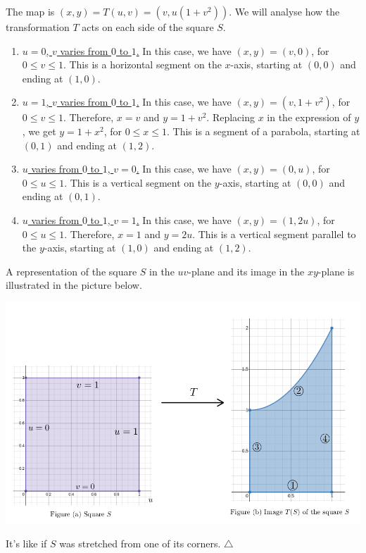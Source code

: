 \documentclass[12pt]{article}
\begin{document}
	The map is $(x, y) = T (u, v) = (v, u (1 + v^2))$. We will analyse how the transformation $T$ acts on each side of the square $S$.
	\begin{enumerate}[label=\Circled{\arabic*}]
		\item \underline{$u = 0$, $v$ varies from $0$ to $1$.} In this case, we have $(x, y) = (v, 0)$, for $0 \leq v \leq 1$. This is a horizontal segment on the $x$-axis, starting at $(0,0)$ and ending at $(1,0)$.
		\item \underline{$u = 1$, $v$ varies from $0$ to $1$.} In this case, we have $(x, y) = (v, 1 + v^2)$, for $0 \leq v \leq 1$. Therefore, $x = v$ and $y = 1 + v^2$. Replacing $x$ in the expression of $y$, we get $y = 1 + x^2$, for $0 \leq x \leq 1$. This is a segment of a parabola, starting at $(0, 1)$ and ending at $(1, 2)$.
		\item \underline{$u$ varies from $0$ to $1$, $v = 0$.} In this case, we have $(x, y) = (0, u)$, for $0 \leq u \leq 1$. This is a vertical segment on the $y$-axis, starting at $(0,0)$ and ending at $(0, 1)$.
		\item \underline{$u$ varies from $0$ to $1$, $v= 1$.} In this case, we have $(x, y) = (1 , 2u )$, for $0 \leq u \leq 1$. Therefore, $x = 1$ and $y = 2u$. This is a vertical segment parallel to the $y$-axis, starting at $(1, 0)$ and ending at $(1, 2)$. 
	\end{enumerate}

	A representation of the square $S$ in the $uv$-plane and its image in the $xy$-plane is illustrated in the picture below.
	\begin{center}
	\includegraphics[scale=0.5]{prob8-15-9.png}
	\end{center}
	It's like if $S$ was stretched from one of its corners. \hfill $\triangle$
\end{document}
